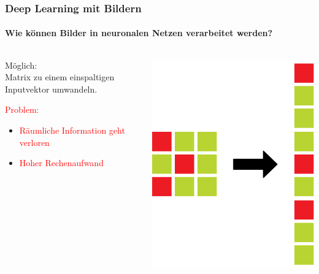 \documentclass{beamer}
\begin{document}
\begin{frame}

\frametitle{Deep Learning mit Bildern}
\framesubtitle{Wie können Bilder in neuronalen Netzen verarbeitet werden?}

\begin{columns}[T]

\begin{column}[T]{5cm}
Möglich:\\
Matrix zu einem einspaltigen Inputvektor umwandeln.\newline

\textcolor{red}{Problem:}
\begin{itemize}
\item{\textcolor{red}{Räumliche Information geht verloren}}
\item{\textcolor{red}{Hoher Rechenaufwand}}
\end{itemize}

\end{column}

\begin{column}[T]{5cm}
	\includegraphics[scale=0.3]{figures/inputimage.png}	 
\end{column}

\end{columns}

\end{frame}
\end{document}
